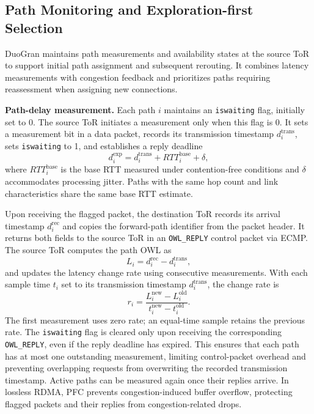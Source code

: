 \documentclass[10pt,journal,compsoc]{IEEEtran}
\begin{document}
\subsection{Path Monitoring and Exploration-first Selection}
\label{sec:OWL_monitoring}
\label{sec:exploration}
DuoGran maintains path measurements and availability states at the source ToR to support initial path assignment and subsequent rerouting. It combines latency measurements with congestion feedback and prioritizes paths requiring reassessment when assigning new connections.

\noindent
\textbf{Path-delay measurement.} Each path $i$ maintains an \texttt{iswaiting} flag, initially set to 0. The source ToR initiates a measurement only when this flag is 0. It sets a measurement bit in a data packet, records its transmission timestamp $d_i^{\mathrm{trans}}$, sets \texttt{iswaiting} to 1, and establishes a reply deadline
\begin{equation}
    d_i^{\mathrm{exp}} = d_i^{\mathrm{trans}} + RTT_i^{\mathrm{base}} + \delta,
    \label{eq:measurement_deadline}
\end{equation}
where $RTT_i^{\mathrm{base}}$ is the base RTT measured under contention-free conditions and $\delta$ accommodates processing jitter. Paths with the same hop count and link characteristics share the same base RTT estimate.

Upon receiving the flagged packet, the destination ToR records its arrival timestamp $d_i^{\mathrm{rec}}$ and copies the forward-path identifier from the packet header. It returns both fields to the source ToR in an \texttt{OWL\_REPLY} control packet via ECMP. The source ToR computes the path OWL as
\begin{equation}
    L_i = d_i^{\mathrm{rec}} - d_i^{\mathrm{trans}},
    \label{eq:owl_measurement}
\end{equation}
and updates the latency change rate using consecutive measurements. With each sample time $t_i$ set to its transmission timestamp $d_i^{\mathrm{trans}}$, the change rate is
\begin{equation}
    r_i = \frac{L_i^{\mathrm{new}}-L_i^{\mathrm{old}}}
                   {t_i^{\mathrm{new}}-t_i^{\mathrm{old}}}.
    \label{eq:owl_rate}
\end{equation}
The first measurement uses zero rate; an equal-time sample retains the previous rate. The \texttt{iswaiting} flag is cleared only upon receiving the corresponding \texttt{OWL\_REPLY}, even if the reply deadline has expired. This ensures that each path has at most one outstanding measurement, limiting control-packet overhead and preventing overlapping requests from overwriting the recorded transmission timestamp. Active paths can be measured again once their replies arrive. In lossless RDMA, PFC prevents congestion-induced buffer overflow, protecting flagged packets and their replies from congestion-related drops.
\end{document}
